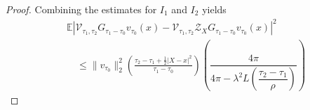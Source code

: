 \begin{proof}
Combining the estimates for $I_1$ and $I_2$
yields
\begin{equation*}
{
\begin{aligned}
&\mathbb E\left|
\mathcal V_{\tau_1,\tau_2}
G_{\tau_1-\tau_0}v_{\tau_0}(x)
-
\mathcal V_{\tau_1,\tau_2}
\mathcal Z_X G_{\tau_1-\tau_0}v_{\tau_0}(x)
\right|^2
\\
&\quad\leq
\|v_{\tau_0}\|_2^2\left(
\frac{
\tau_2-\tau_1+\frac12|X-x|^2
}{
\tau_1-\tau_0
}\right)
\left(\dfrac{4\pi}{4\pi - \lambda^2 L\left(\dfrac{\tau_2-\tau_1}{\rho}\right)}\right)
\end{aligned}
}
\end{equation*}
\end{proof}